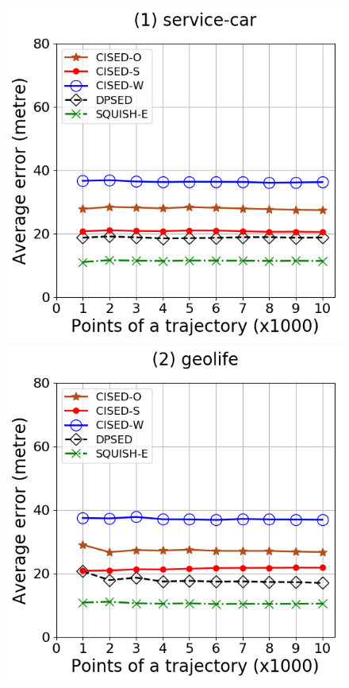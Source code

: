 \begin{figure}[tb!]
	\centering
	\includegraphics[scale = 0.30]{Figures/Exp-error-size-service.png}
	\includegraphics[scale = 0.30]{Figures/Exp-error-size-geolife.png}

\end{figure}
